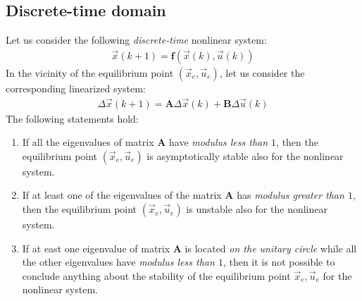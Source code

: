 \documentclass[12pt,a4paper,oneside]{book}
\begin{document}
\begin{onehalfspace}
\subsection{Discrete-time domain}
Let us consider the following \textit{discrete-time} nonlinear system:
\begin{equation}\label{eqlyap3}
	\begin{aligned}
		\vec{x}(k+1)=\mathbf{f}\left(\vec{x}(k),\vec{u}(k)\right) 
	\end{aligned}
\end{equation}
In the vicinity of the equilibrium point $(\vec{x}_e,\vec{u}_e)$, let us 
consider the corresponding linearized system:
\begin{equation}\label{eqlyap4}
	\begin{aligned}
		\Delta{\vec{x}}(k+1)={\mathbf{A}}\Delta\vec{x}(k)+{\mathbf{B}}\Delta\vec{u}(k)
	\end{aligned}
\end{equation}
The following statements hold:
\begin{enumerate}
	\item If all the eigenvalues of matrix ${\mathbf{A}}$ have 
	\textit{modulus less than $1$}, then the equilibrium point $\left( 
	\vec{x}_e, \vec{u}_e\right)$ is asymptotically stable also for the 
	nonlinear system.
	\item If at least one of the eigenvalues of the matrix ${\mathbf{A}}$ 
	has \textit{modulus greater than $1$}, then the equilibrium point $\left( 
	\vec{x}_e, \vec{u}_e\right)$ is unstable also for the nonlinear system.
	\item If at east one eigenvalue of matrix ${\mathbf{A}}$ is located 
	\textit{on the unitary circle} while all the other eigenvalues have 
	\textit{modulus less than $1$}, then it is not possible to conclude 
	anything about the stability of the equilibrium point $\vec{x}_e,\vec{u}_e$ 
	for the nonlinear system.
\end{enumerate}


\end{onehalfspace}
\end{document}
